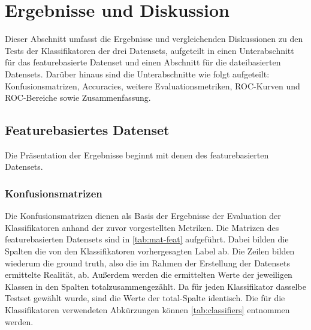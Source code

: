 \section{Ergebnisse und Diskussion}
\label{results}

Dieser Abschnitt umfasst die Ergebnisse und vergleichenden Diskussionen zu den Tests der Klassifikatoren der drei Datensets, aufgeteilt in einen Unterabschnitt für das featurebasierte Datenset und einen Abschnitt für die dateibasierten Datensets. Darüber hinaus sind die Unterabschnitte wie folgt aufgeteilt: Konfusionsmatrizen, Accuracies, weitere Evaluationsmetriken, ROC-Kurven und ROC-Bereiche sowie Zusammenfassung.

\subsection{Featurebasiertes Datenset}

Die Präsentation der Ergebnisse beginnt mit denen des featurebasierten Datensets.

\subsubsection*{Konfusionsmatrizen}

Die Konfusionsmatrizen dienen als Basis der Ergebnisse der Evaluation der Klassifikatoren anhand der zuvor vorgestellten Metriken. Die Matrizen des featurebasierten Datensets sind in \autoref{tab:mat-feat} aufgeführt. Dabei bilden die Spalten die von den Klassifikatoren vorhergesagten Label ab. Die Zeilen bilden wiederum die \glqq ground truth\grqq{}, also die im Rahmen der Erstellung der Datensets ermittelte Realität, ab. Außerdem werden die ermittelten Werte der jeweiligen Klassen in den Spalten \glqq total\grqq zusammengezählt. Da für jeden Klassifikator dasselbe Testset gewählt wurde, sind die Werte der \glqq total\grqq-Spalte identisch. Die für die Klassifikatoren verwendeten Abkürzungen können \autoref{tab:classifiers} entnommen werden.

